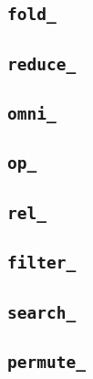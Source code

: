 \subsection{\tt{fold_}}


\subsection{\tt{reduce_}}


\subsection{\tt{omni_}}


\subsection{\tt{op_}}


\subsection{\tt{rel_}}


\subsection{\tt{filter_}}


\subsection{\tt{search_}}


\subsection{\tt{permute_}}


